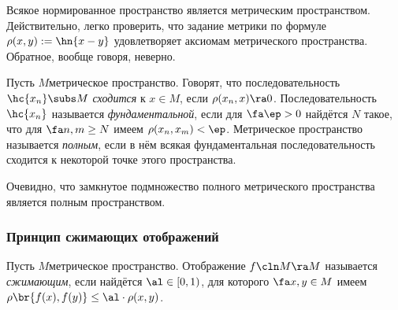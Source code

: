\documentclass[a4paper]{article}
\begin{document}
\begin{note}
Всякое нормированное пространство является метрическим пространством. Действительно,
легко проверить, что задание метрики по формуле $\rho(x,y) := \hn{x - y}$ удовлетворяет
аксиомам метрического пространства. Обратное, вообще говоря, неверно.
\end{note}

\begin{df}
Пусть $M$\т метрическое пространство.
Говорят, что последовательность $\hc{x_n} \subs M$ \emph{сходится} к $x \in M$, если $\rho(x_n,x) \ra 0$.
Последовательность $\hc{x_n}$ называется \emph{фундаментальной}, если для $\fa \ep > 0$ найдётся $N$
такое, что для $\fa n,m\ge N$ имеем $\rho(x_n,x_m) < \ep$.
Метрическое пространство называется \emph{полным}, если в нём всякая фундаментальная последовательность
сходится к некоторой точке этого пространства.
\end{df}

Очевидно, что замкнутое подмножество полного метрического пространства является полным пространством.

\subsubsection{Принцип сжимающих отображений}

\begin{df}
Пусть $M$\т метрическое пространство. Отображение $f\cln M \ra M$ называется \emph{сжимающим},
если найдётся $\al \in [0,1)$, для которого $\fa x, y \in M$ имеем $\rho\br{f(x),f(y)} \le \al\cdot \rho(x,y)$.
\end{df}
\end{document}
